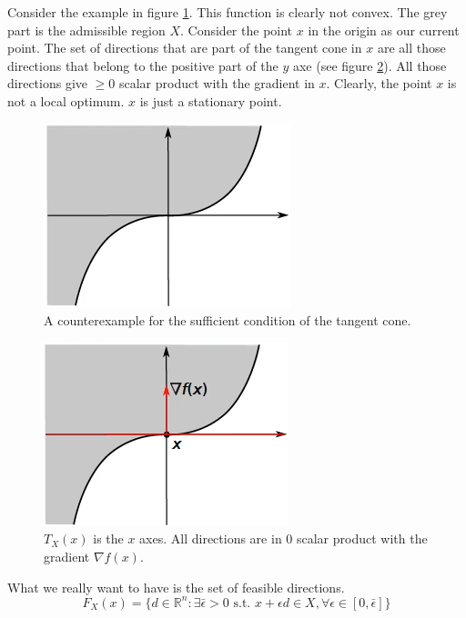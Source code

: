 \par Consider the example in figure \ref{fig:chapter3-tangent_cone_not_sufficient1}. This function is clearly not convex. The grey part is the admissible region $X$. Consider the point $x$ in the origin as our current point. The set of directions that are part of the tangent cone in $x$ are all those directions that belong to the positive part of the $y$ axe (see figure \ref{fig:chapter3-tangent_cone_not_sufficient2}). All those directions give $\geq 0$ scalar product with the gradient in $x$. Clearly, the point $x$ is not a local optimum. $x$ is just a stationary point.
\begin{figure}
    \centering
    \includegraphics[scale=0.5]{figures/3/chapter3-tangent_cone_not_sufficient1.png}
    \caption{A counterexample for the sufficient condition of the tangent cone.}
    \label{fig:chapter3-tangent_cone_not_sufficient1}
\end{figure}
\begin{figure}
    \centering
    \includegraphics[scale=0.5]{figures/3/chapter3-tangent_cone_not_sufficient2.png}
    \caption{$T_X(x)$ is the $x$ axes. All directions are in 0 scalar product with the gradient $\nabla f(x)$.}
    \label{fig:chapter3-tangent_cone_not_sufficient2}
\end{figure}
\par What we really want to have is the set of feasible directions.
\begin{equation}
    F_X(x) = \{d \in \mathbb{R}^n : \exists \bar \epsilon > 0 \mbox{ s.t. } x + \epsilon d \in X, \forall \epsilon \in [0,\bar \epsilon]\}
\end{equation}
